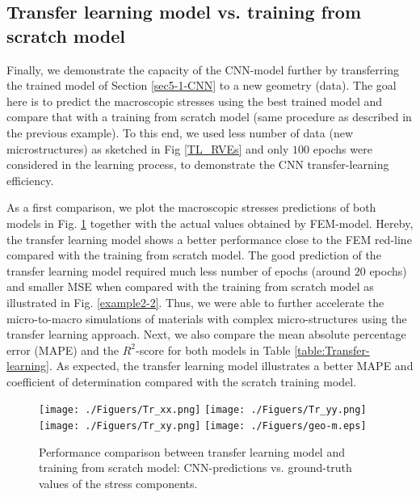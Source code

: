 \documentclass[final,3p,times]{elsarticle}
\begin{document}
\subsection{Transfer learning model vs. training from scratch model}

Finally, we demonstrate the capacity of the CNN-model further by transferring the trained model of Section \ref{sec5-1-CNN} to a new geometry (data). The goal here is to predict the macroscopic stresses using the best trained model and compare that with a training from scratch model (same procedure as described in the previous example). To this end, we used less number of data (new microstructures) as sketched in Fig \ref{TL_RVEs} and only $100$ epochs were considered in the learning process, to demonstrate the CNN transfer-learning efficiency. 

As a first comparison, we plot the macroscopic stresses predictions of both models in Fig. \ref{example2-1} together with the actual values obtained by FEM-model. Hereby, the transfer learning model shows a better performance close to the FEM red-line compared with the training from scratch model. The good prediction of the transfer learning model required much less number of epochs (around $20$ epochs) and smaller MSE when compared with the training from scratch model as illustrated in Fig. \ref{example2-2}. Thus, we were able to further accelerate the micro-to-macro simulations of materials with complex micro-structures using the transfer learning approach. Next, we also compare the mean absolute percentage error (MAPE) and the $R^2$-score for both models in Table \ref{table:Transfer-learning}. As expected, the transfer learning model illustrates a better MAPE and coefficient of determination compared with the scratch training model.

\begin{figure}[t]
	\centering 
	\texttt{[image: ./Figuers/Tr\_xx.png]} \qquad\qquad\qquad
	\texttt{[image: ./Figuers/Tr\_yy.png]}\\[4mm]
 	\texttt{[image: ./Figuers/Tr\_xy.png]} \qquad
	\texttt{[image: ./Figuers/geo-m.eps]} 
	
   \caption{Performance comparison between transfer learning model and training from scratch model: CNN-predictions vs. ground-truth values of the stress components.}
	\label{example2-1}
\end{figure}
\end{document}
